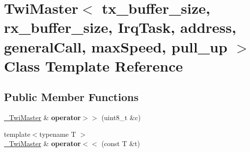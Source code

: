 \hypertarget{classTwiMaster}{}\section{Twi\+Master$<$ tx\+\_\+buffer\+\_\+size, rx\+\_\+buffer\+\_\+size, Irq\+Task, address, general\+Call, max\+Speed, pull\+\_\+up $>$ Class Template Reference}
\label{classTwiMaster}
\subsection*{Public Member Functions}
\begin{DoxyCompactItemize}
\item 
\hypertarget{classTwiMaster_ad5a5e3d07d15d3a0df00a522e26685f8}{}\label{classTwiMaster_ad5a5e3d07d15d3a0df00a522e26685f8} 
\hyperlink{classTwiMaster}{\+\_\+\+Twi\+Master} \& {\bfseries operator$>$$>$} (uint8\+\_\+t \&c)
\item 
\hypertarget{classTwiMaster_a374d865e269be403ffa638c6b1fac64f}{}\label{classTwiMaster_a374d865e269be403ffa638c6b1fac64f} 
{\footnotesize template$<$typename T $>$ }\\\hyperlink{classTwiMaster}{\+\_\+\+Twi\+Master} \& {\bfseries operator$<$$<$} (const T \&t)
\end{DoxyCompactItemize}
